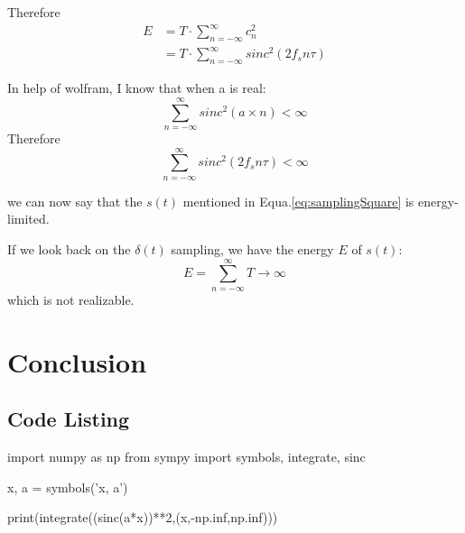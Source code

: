 \documentclass{article}
\begin{document}

Therefore
\begin{equation*}
\begin{aligned}
E &= T \cdot \sum_{n = -\infty}^{\infty} c_n^2 \\ 
&= T \cdot \sum_{n = -\infty}^{\infty} sinc^2(2f_sn\tau)
\end{aligned}
\end{equation*}

In help of wolfram, I know that when a is real:
$$
\sum_{n = -\infty}^{\infty} sinc^2(a\times n) < \infty
$$
Therefore
\begin{equation}
\sum_{n = -\infty}^{\infty} sinc^2(2f_sn\tau) < \infty
\end{equation}

we can now say that the $s(t)$ mentioned in Equa.\ref{eq:samplingSquare} is energy-limited.

If we look back on the $\delta(t)$ sampling, we have the energy $E$ of $s(t)$:
\begin{equation}
E = \sum_{n = -\infty}^{\infty} T \to \infty
\end{equation}
which is not realizable.

\section{Conclusion}
    \subsubsection*{}
    \subsubsection*{}

% 
% 

\begin{appendices}
    \section{Code Listing}
    \begin{python}
    import numpy as np
    from sympy import symbols, integrate, sinc

    x, a = symbols('x, a')

    print(integrate((sinc(a*x))**2,(x,-np.inf,np.inf)))
    \end{python}
\end{appendices}
\end{document}
